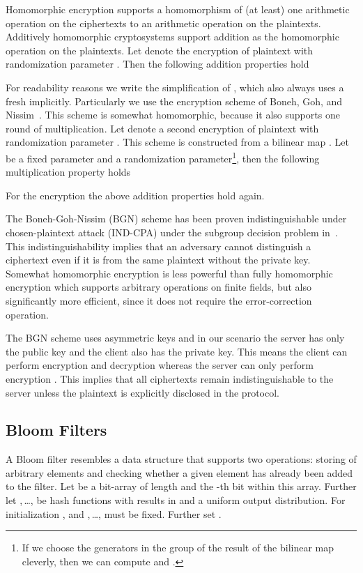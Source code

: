\documentclass{llncs}
\begin{document}
Homomorphic encryption supports a homomorphism of (at least) one arithmetic operation on the ciphertexts to an arithmetic operation on the plaintexts.
Additively homomorphic cryptosystems support addition as the homomorphic operation on the plaintexts.
Let  denote the encryption of plaintext  with randomization parameter .
Then the following addition properties hold

For readability reasons we write the simplification of , which also always uses a fresh  implicitly.
Particularly we use the encryption scheme of Boneh, Goh, and Nissim~\cite{BonGoh05}.
This scheme is somewhat homomorphic, because it also supports one round of multiplication.
Let  denote a second encryption of plaintext  with randomization parameter .
This scheme is constructed from a bilinear map .
Let  be a fixed parameter and  a randomization parameter\footnote{If we choose the generators in the group of the result of the bilinear map cleverly, then we can compute  and .}, then the following multiplication property holds

For the encryption  the above addition properties hold again.

The Boneh-Goh-Nissim (BGN) scheme has been proven indistinguishable under chosen-plaintext attack (IND-CPA) under the subgroup decision problem in~\cite{BonGoh05}.
This indistinguishability implies that an adversary cannot distinguish a ciphertext even if it is from the same plaintext without the private key.
Somewhat homomorphic encryption is less powerful than fully homomorphic encryption which supports arbitrary operations on finite fields, but also significantly more efficient, since it does not require the error-correction operation.

The BGN scheme uses asymmetric keys and in our scenario the server has only the public key and the client also has the private key.
This means the client can perform encryption  and decryption  whereas the server can only perform encryption .
This implies that all ciphertexts remain indistinguishable to the server unless the plaintext is explicitly disclosed in the protocol.

\subsection{Bloom Filters}
\label{sec:bf}

A Bloom filter resembles a data structure that supports two operations: storing of arbitrary elements and checking whether a given element has already been added to the filter.
Let  be a bit-array of length  and  the -th bit within this array.
Further let ,\,\dots, be  hash functions with results in  and a uniform output distribution.
For initialization ,  and ,\,\dots, must be fixed.
Further set .
\end{document}
